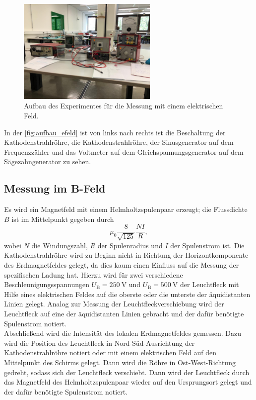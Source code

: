     \begin{figure}[H]
        \centering
        \includegraphics[width=0.6\textwidth]{bilder/foto_elektrisch.jpeg}
        \caption{Aufbau des Experimentes für die Messung mit einem elektrischen Feld.}
        \label{fig:aufbau_efeld}
    \end{figure} 

    \noindent In der \autoref{fig:aufbau_efeld} ist von links nach rechts ist die Beschaltung der Kathodenstrahlröhre, die Kathodenstrahlröhre, der Sinusgenerator auf dem 
    Frequenzzähler und das Voltmeter auf dem Gleichspannungsgenerator auf dem Sägezahngenerator zu sehen.

\subsection{Messung im B-Feld}

    Es wird ein Magnetfeld mit einem Helmholtzspulenpaar erzeugt; die Flussdichte $B$ ist im Mittelpunkt gegeben durch 
    \begin{equation*}
        \mu_0 \frac{8}{\sqrt{125}} \frac{N I}{R},
    \end{equation*}
    wobei $N$ die Windungszahl, $R$ der Spulenradius und $I$ der Spulenstrom ist. Die Kathodenstrahlröhre wird zu Beginn nicht in Richtung der Horizontkomponente
    des Erdmagnetfeldes gelegt, da dies kaum einen Einfluss auf die Messung der spezifischen Ladung hat. Hierzu wird für zwei verschiedene Beschleunigungsspannungen 
    $U_{\text{B}} = \SI{250}{\volt}$ und $U_{\text{B}} = \SI{500}{\volt}$ der Leuchtfleck mit Hilfe eines elektrischen Feldes auf die oberste oder die unterste der
    äquidistanten Linien gelegt. Analog zur Messung der Leuchtfleckverschiebung wird der Leuchtfleck auf eine der äquidistanten Linien gebracht und der dafür benötigte
    Spulenstrom notiert. \\

    \noindent Abschließend wird die Intensität des lokalen Erdmagnetfeldes gemessen. Dazu wird die Position des Leuchtfleck in Nord-Süd-Ausrichtung der 
    Kathodenstrahlröhre notiert oder mit einem elektrischen Feld auf den Mittelpunkt des Schirms gelegt. Dann wird die Röhre in Ost-West-Richtung gedreht, sodass
    sich der Leuchtfleck verschiebt. Dann wird der Leuchtfleck durch das Magnetfeld des Helmholtzspulenpaar wieder auf den Ursprungsort gelegt und der 
    dafür benötigte Spulenstrom notiert. \\

